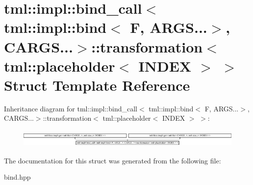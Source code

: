 \hypertarget{structtml_1_1impl_1_1bind__call_3_01tml_1_1impl_1_1bind_3_01F_00_01ARGS_8_8_8_4_00_01CARGS_8_8_8b31c1e79a178629d85ce4e534073804d}{\section{tml\+:\+:impl\+:\+:bind\+\_\+call$<$ tml\+:\+:impl\+:\+:bind$<$ F, A\+R\+G\+S...$>$, C\+A\+R\+G\+S...$>$\+:\+:transformation$<$ tml\+:\+:placeholder$<$ I\+N\+D\+E\+X $>$ $>$ Struct Template Reference}
\label{structtml_1_1impl_1_1bind__call_3_01tml_1_1impl_1_1bind_3_01F_00_01ARGS_8_8_8_4_00_01CARGS_8_8_8b31c1e79a178629d85ce4e534073804d}
}
Inheritance diagram for tml\+:\+:impl\+:\+:bind\+\_\+call$<$ tml\+:\+:impl\+:\+:bind$<$ F, A\+R\+G\+S...$>$, C\+A\+R\+G\+S...$>$\+:\+:transformation$<$ tml\+:\+:placeholder$<$ I\+N\+D\+E\+X $>$ $>$\+:\begin{figure}[H]
\begin{center}
\leavevmode
\includegraphics[height=0.906149cm]{structtml_1_1impl_1_1bind__call_3_01tml_1_1impl_1_1bind_3_01F_00_01ARGS_8_8_8_4_00_01CARGS_8_8_8b31c1e79a178629d85ce4e534073804d}
\end{center}
\end{figure}


The documentation for this struct was generated from the following file\+:\begin{DoxyCompactItemize}
\item 
bind.\+hpp\end{DoxyCompactItemize}
